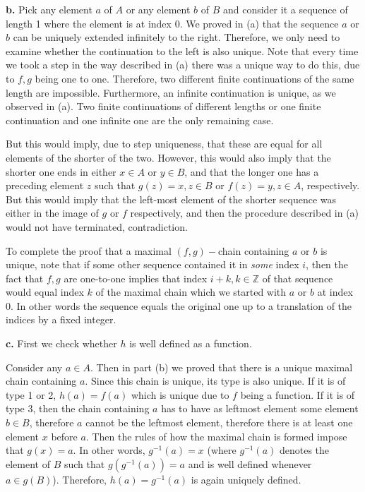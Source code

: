 \begin{solution}
    \textbf{b.} Pick any element $a$ of $A$ or any element $b$ of $B$ and consider it a sequence of length 1 where the element is at index 0. We proved in (a) that the sequence $a$ or $b$ can be uniquely extended infinitely to the right. Therefore, we only need to examine whether the continuation to the left is also unique. Note that every time we took a step in the way described in (a) there was a unique way to do this, due to $f, g$ being one to one. Therefore, two different finite continuations of the same length are impossible. Furthermore, an infinite continuation is unique, as we observed in (a). Two finite continuations of different lengths or one finite continuation and one infinite one are the only remaining case.

    But this would imply, due to step uniqueness, that these are equal for all elements of the shorter of the two. However, this would also imply that the shorter one ends in either $x \in A$ or $y \in B$, and that the longer one has a preceding element $z$ such that $g(z) = x, z \in B$ or $f(z) = y, z \in A$, respectively. But this would imply that the left-most element of the shorter sequence was either in the image of $g$ or $f$ respectively, and then the procedure described in (a) would not have terminated, contradiction.

    To complete the proof that a maximal $(f, g)-$chain containing $a$ or $b$ is unique, note that if some other sequence contained it in \textit{some} index $i$, then the fact that $f, g$ are one-to-one implies that index $i+k, k \in \mathbb{Z}$ of that sequence would equal index $k$ of the maximal chain which we started with $a$ or $b$ at index 0. In other words the sequence equals the original one up to a translation of the indices by a fixed integer.

    \textbf{c.} First we check whether $h$ is well defined as a function. 
    
    Consider any $a \in A$. Then in part (b) we proved that there is a unique maximal chain containing $a$. Since this chain is unique, its type is also unique. If it is of type 1 or 2, $h(a) = f(a)$ which is unique due to $f$ being a function. If it is of type 3, then the chain containing $a$ has to have as leftmost element some element $b \in B$, therefore $a$ cannot be the leftmost element, therefore there is at least one element $x$ before $a$. Then the rules of how the maximal chain is formed impose that $g(x) = a$. In other words, $g^{-1}(a) = x$ (where $g^{-1}(a)$ denotes the element of $B$ such that $g(g^{-1}(a)) = a$ and is well defined whenever $a \in g(B)$). Therefore, $h(a) = g^{-1}(a)$ is again uniquely defined.


\end{solution}
